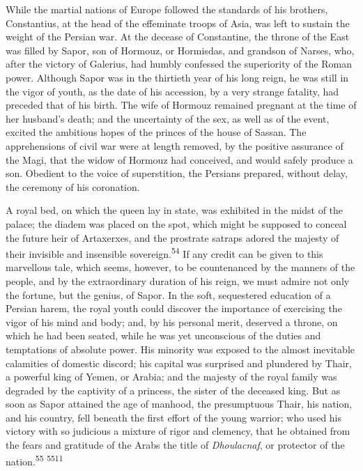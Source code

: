 
While the martial nations of Europe followed the standards of his
brothers, Constantius, at the head of the effeminate troops of
Asia, was left to sustain the weight of the Persian war. At the
decease of Constantine, the throne of the East was filled by
Sapor, son of Hormouz, or Hormisdas, and grandson of Narses, who,
after the victory of Galerius, had humbly confessed the
superiority of the Roman power. Although Sapor was in the
thirtieth year of his long reign, he was still in the vigor of
youth, as the date of his accession, by a very strange fatality,
had preceded that of his birth. The wife of Hormouz remained
pregnant at the time of her husband’s death; and the uncertainty
of the sex, as well as of the event, excited the ambitious hopes
of the princes of the house of Sassan. The apprehensions of civil
war were at length removed, by the positive assurance of the
Magi, that the widow of Hormouz had conceived, and would safely
produce a son. Obedient to the voice of superstition, the
Persians prepared, without delay, the ceremony of his coronation.

A royal bed, on which the queen lay in state, was exhibited in
the midst of the palace; the diadem was placed on the spot, which
might be supposed to conceal the future heir of Artaxerxes, and
the prostrate satraps adored the majesty of their invisible and
insensible sovereign.\textsuperscript{54} If any credit can be given to this
marvellous tale, which seems, however, to be countenanced by the
manners of the people, and by the extraordinary duration of his
reign, we must admire not only the fortune, but the genius, of
Sapor. In the soft, sequestered education of a Persian harem, the
royal youth could discover the importance of exercising the vigor
of his mind and body; and, by his personal merit, deserved a
throne, on which he had been seated, while he was yet unconscious
of the duties and temptations of absolute power. His minority was
exposed to the almost inevitable calamities of domestic discord;
his capital was surprised and plundered by Thair, a powerful king
of Yemen, or Arabia; and the majesty of the royal family was
degraded by the captivity of a princess, the sister of the
deceased king. But as soon as Sapor attained the age of manhood,
the presumptuous Thair, his nation, and his country, fell beneath
the first effort of the young warrior; who used his victory with
so judicious a mixture of rigor and clemency, that he obtained
from the fears and gratitude of the Arabs the title of
\textit{Dhoulacnaf}, or protector of the nation.\textsuperscript{55} \textsuperscript{5511}

